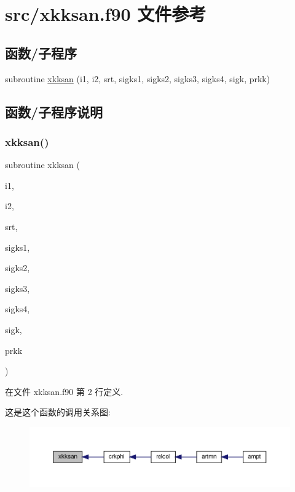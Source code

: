 \hypertarget{xkksan_8f90}{}\section{src/xkksan.f90 文件参考}
\label{xkksan_8f90}
\subsection*{函数/子程序}
\begin{DoxyCompactItemize}
\item 
subroutine \mbox{\hyperlink{xkksan_8f90_abc76ae0adf39772d59088550d36f9ab9}{xkksan}} (i1, i2, srt, sigks1, sigks2, sigks3, sigks4, sigk, prkk)
\end{DoxyCompactItemize}


\subsection{函数/子程序说明}
\mbox{\label{xkksan_8f90_abc76ae0adf39772d59088550d36f9ab9}} 
\subsubsection{\texorpdfstring{xkksan()}{xkksan()}}
{\footnotesize\ttfamily subroutine xkksan (\begin{DoxyParamCaption}\item[{}]{i1,  }\item[{}]{i2,  }\item[{}]{srt,  }\item[{}]{sigks1,  }\item[{}]{sigks2,  }\item[{}]{sigks3,  }\item[{}]{sigks4,  }\item[{}]{sigk,  }\item[{}]{prkk }\end{DoxyParamCaption})}



在文件 xkksan.\+f90 第 2 行定义.

这是这个函数的调用关系图\+:
\nopagebreak
\begin{figure}[H]
\begin{center}
\leavevmode
\includegraphics[width=350pt]{xkksan_8f90_abc76ae0adf39772d59088550d36f9ab9_icgraph}
\end{center}
\end{figure}
